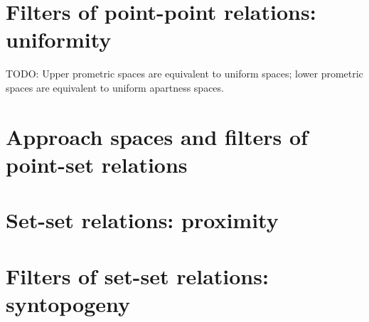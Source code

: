 \documentclass{article}
\begin{document}


\section{Filters of point-point relations: uniformity}
\label{sec:uniformity}


TODO: Upper prometric spaces are equivalent to uniform spaces; lower prometric spaces are equivalent to uniform apartness spaces.


\section{Approach spaces and filters of point-set relations}
\label{sec:approach}



\section{Set-set relations: proximity}
\label{sec:set-set}
\label{sec:proximity}



\section{Filters of set-set relations: syntopogeny}
\label{sec:syntop}
\end{document}
